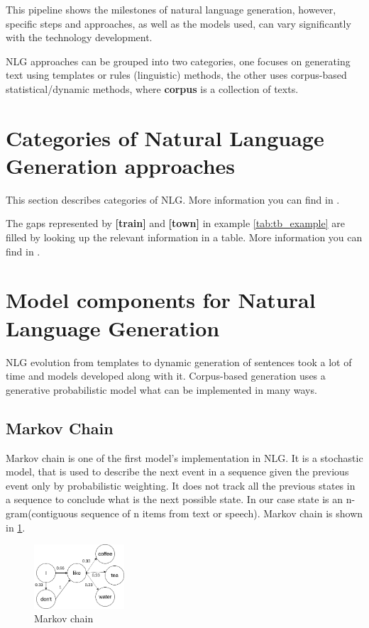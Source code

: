 This pipeline shows the milestones of natural language generation, however, specific steps and approaches, as well as the models used, can vary significantly with the technology development.

NLG approaches can be grouped into two categories, one focuses on generating text using templates or rules (linguistic) methods, the other uses corpus-based statistical/dynamic methods, where \textbf{corpus} is a collection of texts.

\section{Categories of Natural Language Generation approaches}
This section describes categories of NLG. More information you can find in \cite{rudnicky2002dialog} \cite{chen2017survey} \cite{manishina2016data}.


The gaps represented by \textbf{[train]} and \textbf{[town]} in example \ref{tab:tb_example} are filled by looking up the relevant
information in a table. More information you can find in \cite{applied_nlg}.


\section{Model components for Natural Language Generation}
NLG evolution from templates to dynamic generation of sentences took a lot of time and models developed along with it. Corpus-based generation uses a generative probabilistic model what can be implemented in many ways.

\subsection{Markov Chain}
Markov chain is one of the first model's implementation in NLG. It is a stochastic model, that is used to describe the next event in a sequence given the previous event only by probabilistic weighting. It does not track all the previous states in a sequence to conclude what is the next possible state. In our case state is an n-gram(contiguous sequence of n items from text or speech). Markov chain is shown in \ref{markov_chain}.

\begin{figure}[hbt]
  \centering
  \includegraphics[width=0.3\textwidth]{figures/MarkovChain.png}
  \caption{Markov chain}
  \label{markov_chain}
\end{figure}

